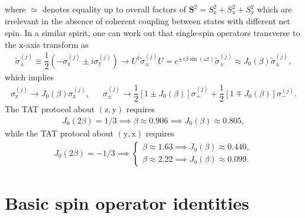 \documentclass[aps,notitlepage,nofootinbib,11pt]{revtex4-1}
\newcommand{\f}[2]{\dfrac{#1}{#2}} %
\newcommand{\p}[1]{\left(#1\right)} %
\renewcommand{\sp}[1]{\left[#1\right]} %
\renewcommand{\v}{\bm} %
\newcommand{\z}{\text{z}}
\newcommand{\x}{\text{x}}
\newcommand{\y}{\text{y}}
\newcommand{\1}{\mathds{1}}
\begin{document}
where $\simeq$ denotes equality up to overall factors of
$\v S^2=S_\z^2+S_\x^2+S_\y^2$ which are irrelevant in the absence of
coherent coupling between states with different net spin.  In a
similar spirit, one can work out that single-spin operators transverse
to the $\x$-axis transform as
\begin{align}
  \tilde\sigma_\pm^{(j)}
  \equiv \f12\p{-\sigma_\z^{(j)}\pm i\sigma_\y^{(j)}}
  \to U^\dag \tilde\sigma_\pm^{(j)} U
  = e^{\pm i\beta\sin\p{\omega t}} \tilde\sigma_\pm^{(j)}
  \approx J_0\p{\beta} \tilde\sigma_\pm^{(j)},
\end{align}
which implies
\begin{align}
  \sigma_\z^{(j)} \to J_0\p{\beta} \sigma_\z^{(j)},
  &&
  \sigma_\pm^{(j)}
  \to \f12\sp{1 \pm J_0\p{\beta}} \sigma_+^{(j)}
  + \f12\sp{1 \mp J_0\p{\beta}} \sigma_-^{(j)}.
\end{align}
The TAT protocol about $\p{\z,\y}$ requires
\begin{align}
  J_0\p{2\beta} = 1/3
  \implies \beta \approx 0.906
  \implies J_0\p{\beta} \approx 0.805,
\end{align}
while the TAT protocol about $\p{\y,\x}$ requires
\begin{align}
  J_0\p{2\beta} = -1/3
  \implies
  \begin{cases}
    \beta \approx 1.63
    \implies J_0\p{\beta} \approx 0.440, \\
    \beta \approx 2.22
    \implies J_0\p{\beta} \approx 0.099.
  \end{cases}
\end{align}




\newpage
\appendix

\section{Basic spin operator identities}
\label{sec:identities}
\end{document}
